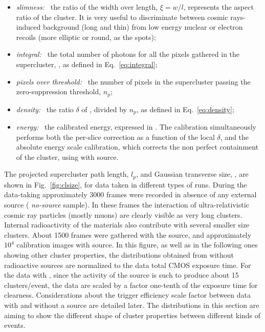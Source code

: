 \begin{itemize}
  \item \textit{slimness:~} the ratio of the width over length,
    $\xi=w/l$, represents the aspect ratio of the cluster. It is very
    useful to discriminate between cosmic rays-induced background
    (long and thin) from low energy nuclear or electron recoils (more
    elliptic or round, as the \fe spots);
    
  \item \textit{integral:~} the total number of photons for all the
  pixels gathered in the supercluster, \isclu, as defined in
  Eq.~\ref{eq:integral};

  \item \textit{pixels over threshold:~} the number of pixels in the
  supercluster passing the zero-suppression threshold, $n_p$;

  \item \textit{density:~} the ratio $\delta$ of \isclu, divided by
  $n_p$, as defined in Eq.~\ref{eq:density};

  \item \textit{energy:~} the calibrated energy, expressed
    in \keV. The calibration simultaneously performs both the
    per-slice correction as a function of the local $\delta$, and the
    absolute energy scale calibration, which corrects the non perfect
    containment of the cluster, using with \fe source.
\end{itemize}

The projected supercluster path length, $l_p$, and Gaussian transverse
size, \tsigmag, are shown in Fig.~\ref{fig:clsize}, for data taken in
different types of runs.  During the data-taking approximately 3000
frames were recorded in absence of any external source ({\it
no-source} sample). In these frames the interaction of
ultra-relativistic cosmic ray particles (mostly muons) are clearly
visible as very long clusters. Internal radioactivity of the \lemon
materials also contribute with several smaller size clusters. About
1500 frames were gathered with the \ambe source, and approximately
$10^4$ calibration images with \fe source. In this figure, as well as
in the following ones showing other cluster properties, the
distributions obtained from without radioactive sources are normalized
to the \ambe data total CMOS exposure time. For the data with \fe,
since the activity of the source is such to produce about 15
clusters/event, the data are scaled by a factor one-tenth of the \ambe
exposure time for clearness. Considerations about the trigger
efficiency scale factor between data with and without a source are
detailed later. The distributions in this section are aiming to show
the different shape of cluster properties between different kinds of
events.

